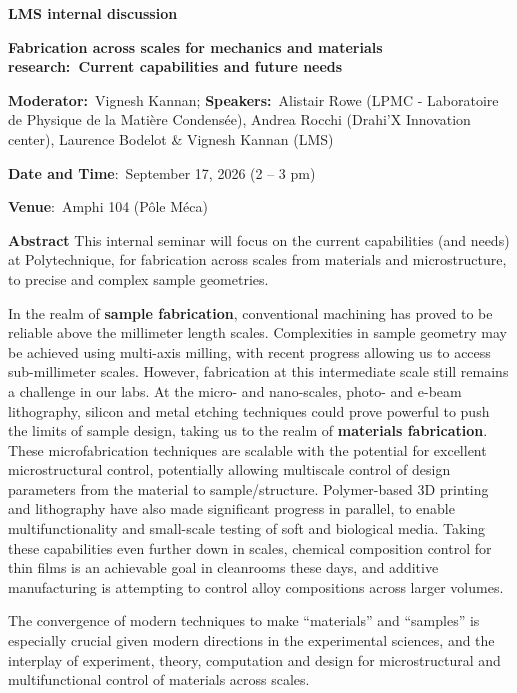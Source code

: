 \documentclass[a4paper,12pt,fleqn]{article}
\begin{document}
	\sffamily
\thispagestyle{titlepage}
\vspace*{-3em}
\begin{center}
	\Large \textbf{LMS internal discussion}
\end{center}
\begin{center}
	\Large 
	\textbf{Fabrication across scales for mechanics and materials research:~Current capabilities and future needs} 
\end{center}
\begin{center}
	\small
	\vspace*{-0.5em}
	\textbf{Moderator:}~Vignesh Kannan;	\textbf{Speakers:}~Alistair Rowe (LPMC - Laboratoire de Physique de la Matière Condensée), Andrea Rocchi (Drahi'X Innovation center), Laurence Bodelot \& Vignesh Kannan (LMS) \\
	\vspace*{0.5em}
	{\large
	\textbf{Date and Time}:~September 17, 2026 (2 -- 3 pm)
	
	\textbf{Venue}:~Amphi 104 (P{\^o}le M{\'e}ca) }
\end{center}
\vspace*{-1em}
\begin{myhlbox}{{\textbf{Abstract}}}
	This internal seminar will focus on the current capabilities (and needs) at Polytechnique, for fabrication across scales from materials and microstructure, to precise and complex sample geometries.

	In the realm of \textbf{sample fabrication}, conventional machining has proved to be reliable above the millimeter length scales. Complexities in sample geometry may be achieved using multi-axis milling, with recent progress allowing us to access sub-millimeter scales. However, fabrication at this intermediate scale still remains a challenge in our labs. At the micro- and nano-scales, photo- and e-beam lithography, silicon and metal etching techniques could prove powerful to push the limits of sample design, taking us to the realm of \textbf{materials fabrication}. These microfabrication techniques are scalable with the potential for excellent microstructural control, potentially allowing multiscale control of design parameters from the material to sample/structure. Polymer-based 3D printing and lithography have also made significant progress in parallel, to enable multifunctionality and small-scale testing of soft and biological media. Taking these capabilities even further down in scales, chemical composition control for thin films is an achievable goal in cleanrooms these days, and additive manufacturing is attempting to control alloy compositions across larger volumes.

	The convergence of modern techniques to make ``materials'' and ``samples'' is especially crucial given modern directions in the experimental sciences, and the interplay of experiment, theory, computation and design for microstructural and multifunctional control of materials across scales. 
\end{myhlbox}
\end{document}
